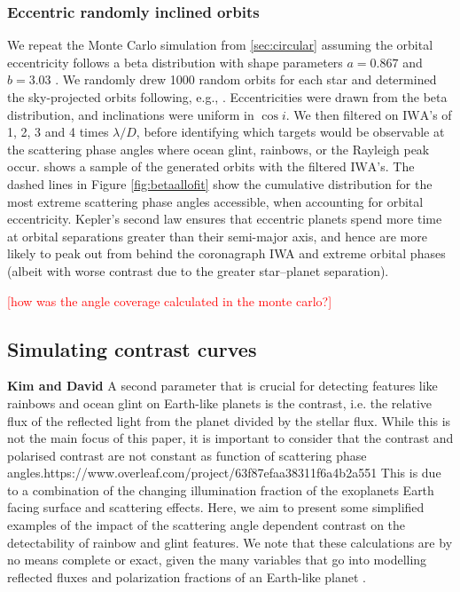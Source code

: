 \documentclass[
    usenatbib,
]{mnras}
\newcommand{\todo}[1]{\textcolor{red}{[#1]}}
\newcommand{\IWA}{\ensuremath{\mathrm{IWA}}}
\begin{document}
\subsubsection{Eccentric randomly inclined orbits}
\label{sec:eccentric}
We repeat the Monte Carlo simulation from \cref{sec:circular} assuming the orbital eccentricity follows a beta distribution with shape parameters $a=0.867$ and $b=3.03$ \citep{2013MNRAS.434L..51K}. 
%
We randomly drew 1000 random orbits for each star and determined the sky-projected orbits following, e.g., \cite{2010exop.book...15M}. Eccentricities were drawn from the beta distribution, and inclinations were uniform in $\cos i$. 
%
We then filtered on \IWA's of 1, 2, 3 and 4 times $\lambda / D$, before identifying which targets would be observable at the scattering phase angles where ocean glint, rainbows, or the Rayleigh peak occur. 
%
 shows a sample of the generated orbits with the filtered \IWA's. The dashed lines in Figure \ref{fig:betaallofit} show the cumulative distribution for the most extreme scattering phase angles accessible, when accounting for orbital eccentricity.  Kepler's second law ensures that eccentric planets spend more time at orbital separations greater than their semi-major axis, and hence are more likely to peak out from behind the coronagraph IWA and extreme orbital phases (albeit with worse contrast due to the greater star--planet separation). 

\todo{how was the angle coverage calculated in the monte carlo?}

%

\subsection{Simulating contrast curves}
\textbf{Kim and David}
%
A second parameter that is crucial for detecting features like rainbows and ocean glint on Earth-like planets is the contrast, i.e. the relative flux of the reflected light from the planet divided by the stellar flux. 
%
While this is not the main focus of this paper, it is important to consider that the contrast and polarised contrast are not constant as function of scattering phase angles.https://www.overleaf.com/project/63f87efaa38311f6a4b2a551
%
This is due to a combination of the changing illumination fraction of the exoplanets Earth facing surface and scattering effects.
%
Here, we aim to present some simplified examples of the impact of the scattering angle dependent contrast on the detectability of rainbow and glint features. 
%
We note that these calculations are by no means complete or exact, given the many variables that go into modelling reflected fluxes and polarization fractions of an Earth-like planet \citep{ treesstam2019,trees2022}.
\end{document}
